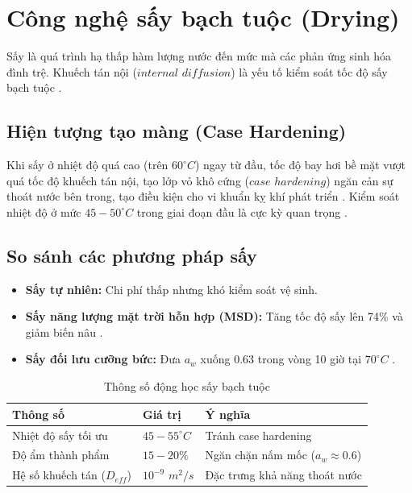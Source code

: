 \documentclass[12pt,a4paper]{report}
\begin{document}
\section{Công nghệ sấy bạch tuộc (Drying)}

Sấy là quá trình hạ thấp hàm lượng nước đến mức mà các phản ứng sinh hóa đình trệ. Khuếch tán nội ($internal$ $diffusion$) là yếu tố kiểm soát tốc độ sấy bạch tuộc \cite{octopus_drying}.

\subsection{Hiện tượng tạo màng (Case Hardening)}

Khi sấy ở nhiệt độ quá cao (trên $60^\circ C$) ngay từ đầu, tốc độ bay hơi bề mặt vượt quá tốc độ khuếch tán nội, tạo lớp vỏ khô cứng ($case$ $hardening$) ngăn cản sự thoát nước bên trong, tạo điều kiện cho vi khuẩn kỵ khí phát triển \cite{case_hardening}. Kiểm soát nhiệt độ ở mức $45-50^\circ C$ trong giai đoạn đầu là cực kỳ quan trọng \cite{vacuum_drying}.

\subsection{So sánh các phương pháp sấy}

\begin{itemize}
    \item \textbf{Sấy tự nhiên:} Chi phí thấp nhưng khó kiểm soát vệ sinh.
    \item \textbf{Sấy năng lượng mặt trời hỗn hợp (MSD):} Tăng tốc độ sấy lên 74\% và giảm biến nâu \cite{octopus_drying}.
    \item \textbf{Sấy đối lưu cưỡng bức:} Đưa $a_w$ xuống 0.63 trong vòng 10 giờ tại $70^\circ C$ \cite{octopus_kinetics}.
\end{itemize}

\begin{table}[H]
\centering
\caption{Thông số động học sấy bạch tuộc}
\begin{tabular}{lll}
\toprule
\textbf{Thông số} & \textbf{Giá trị} & \textbf{Ý nghĩa} \\
\midrule
Nhiệt độ sấy tối ưu & $45-55^\circ C$ & Tránh case hardening \cite{vacuum_drying} \\
Độ ẩm thành phẩm & $15-20\%$ & Ngăn chặn nấm mốc ($a_w \approx 0.6$) \cite{fish_preservation} \\
Hệ số khuếch tán ($D_{eff}$) & $10^{-9}$ $m^2/s$ & Đặc trưng khả năng thoát nước \cite{pressure_drying} \\
\bottomrule
\end{tabular}
\end{table}
\end{document}
